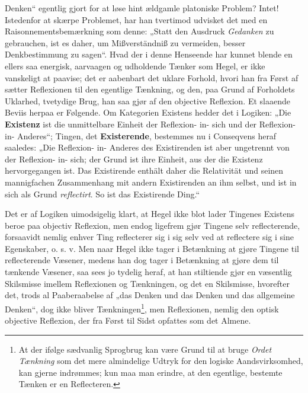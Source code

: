 \documentclass[11pt]{book}
\newcommand{\opage}[1]{\marginnote{\footnotesize\textit{[#1]}}}
\begin{document}
Denken“ egentlig gjort for at løse hint ældgamle platoniske Problem? Intet!
Istedenfor at skærpe Problemet, har han tvertimod udvisket det med en
Raisonnementsbemærkning som denne: „Statt den Ausdruck \emph{Gedanken} zu
gebrauchen, ist es daher, um Mißverständniß zu vermeiden, besser
Denkbestimmung zu sagen“. Hvad der i denne Henseende har kunnet blende en
ellers saa energisk, aarvaagen og udholdende Tænker som Hegel, er ikke
vanskeligt at paavise; det er aabenbart det uklare Forhold, hvori han fra
Først af sætter Reflexionen til den egentlige Tænkning, og den, paa Grund
af Forholdets Uklarhed, tvetydige Brug, han saa gjør af den objective
Reflexion. Et slaaende Beviis herpaa er Følgende. Om Kategorien Existens
hedder det
\opage{59} \setcounter{footnote}{0}%
i Logiken: „Die \textbf{Existenz} ist die unmittelbare Einheit der
Reflexion- in- sich und der Reflexion- in- Anderes“; Tingen, det
\textbf{Existerende}, bestemmes nu i Conseqvens heraf saaledes: „Die
Reflexion- in- Anderes des Existirenden ist aber ungetrennt von der
Reflexion- in- sich; der Grund ist ihre Einheit, aus der die Existenz
hervorgegangen ist. Das Existirende enthält daher die Relativität und
seinen mannigfachen Zusammenhang mit andern Existirenden an ihm selbst, und
ist in sich als Grund \emph{reflectirt}. So ist das Existirende Ding.“

Det er af Logiken uimodsigelig klart, at Hegel ikke blot lader Tingenes
Existens beroe paa objectiv Reflexion, men endog ligefrem gjør Tingene selv
reflecterende, forsaavidt nemlig enhver Ting reflecterer sig i sig selv ved
at reflectere sig i sine Egenskaber, o. s. v. Men naar Hegel ikke tager i
Betænkning at gjøre Tingene til reflecterende Væsener, medens han dog tager
i Betænkning at gjøre dem til tænkende Væsener, saa sees jo tydelig heraf,
at han stiltiende gjør en væsentlig Skilsmisse imellem Reflexionen og
Tænkningen, og det en Skilsmisse, hvorefter det, trods al Paaberaabelse af
„das Denken und das Denken und das allgemeine Denken“, dog ikke bliver
Tænkningen\footnote{At der ifølge sædvanlig Sprogbrug kan være Grund til at
bruge \emph{Ordet Tænkning} som det mere almindelige Udtryk for den logiske
Aandsvirksomhed, kan gjerne indrømmes; kun maa man erindre, at den
egentlige, bestemte Tænken er en Reflecteren.}, men Reflexionen, nemlig den
optisk objective Reflexion, der fra Først til Sidst opfattes som det
Almene.
\end{document}

